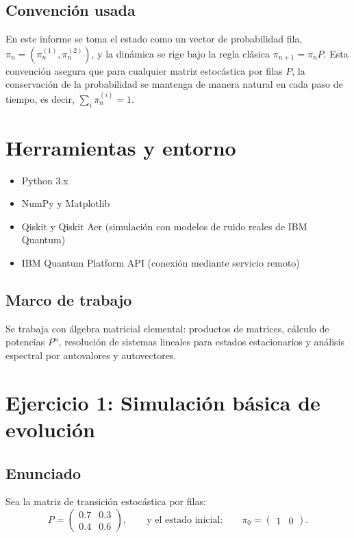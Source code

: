 \documentclass[12pt,a4paper]{article}
\begin{document}
\subsection{Convención usada}
En este informe se toma el estado como un vector de probabilidad fila,
\(\pi_n = (\pi_n^{(1)},\pi_n^{(2)})\), y la dinámica se rige bajo la regla clásica
\(\pi_{n+1} = \pi_n P\). Esta convención asegura que para cualquier matriz estocástica por filas \(P\), la conservación de la probabilidad se mantenga de manera natural en cada paso de tiempo, es decir, \(\sum_i \pi_n^{(i)} = 1\).

\section{Herramientas y entorno}

\begin{itemize}
  \item Python 3.x
  \item NumPy y Matplotlib
  \item Qiskit y Qiskit Aer (simulación con modelos de ruido reales de IBM Quantum)
  \item IBM Quantum Platform API (conexión mediante servicio remoto)
\end{itemize}

\subsection{Marco de trabajo}
Se trabaja con álgebra matricial elemental: productos de matrices, cálculo de
potencias \(P^n\), resolución de sistemas lineales para estados estacionarios y
análisis espectral por autovalores y autovectores.

\section{Ejercicio 1: Simulación básica de evolución}

\subsection*{Enunciado}
Sea la matriz de transición estocástica por filas:
\[
P=
\begin{pmatrix}
0.7 & 0.3\\
0.4 & 0.6
\end{pmatrix},
\qquad
\text{y el estado inicial:}
\qquad
\pi_0=
\begin{pmatrix}
1 & 0
\end{pmatrix}.
\]
\end{document}
